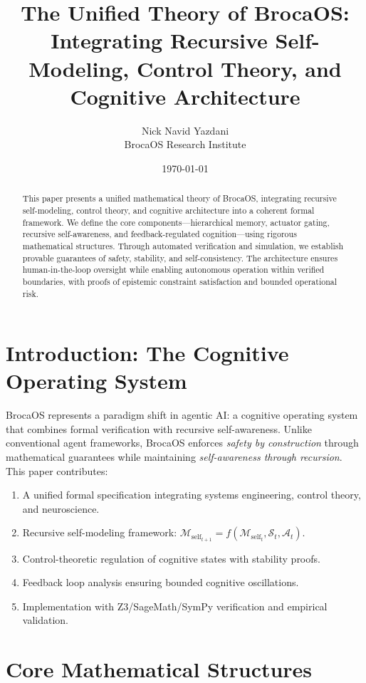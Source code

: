 \documentclass[12pt]{article}
\title{The Unified Theory of BrocaOS: Integrating Recursive Self-Modeling, Control Theory, and Cognitive Architecture}
\author{Nick Navid Yazdani\\BrocaOS Research Institute}
\date{\today}
\theoremstyle{definition}
\newcommand{\state}{\mathcal{S}}
\newcommand{\action}{\mathcal{A}}
\newcommand{\self}{\mathcal{M}_{\text{self}}}
\begin{document}
\maketitle

\begin{abstract}
This paper presents a unified mathematical theory of BrocaOS, integrating recursive self-modeling, control theory, and cognitive architecture into a coherent formal framework. We define the core components—hierarchical memory, actuator gating, recursive self-awareness, and feedback-regulated cognition—using rigorous mathematical structures. Through automated verification and simulation, we establish provable guarantees of safety, stability, and self-consistency. The architecture ensures human-in-the-loop oversight while enabling autonomous operation within verified boundaries, with proofs of epistemic constraint satisfaction and bounded operational risk.
\end{abstract}

\section{Introduction: The Cognitive Operating System}

BrocaOS represents a paradigm shift in agentic AI: a cognitive operating system that combines formal verification with recursive self-awareness. Unlike conventional agent frameworks, BrocaOS enforces \emph{safety by construction} through mathematical guarantees while maintaining \emph{self-awareness through recursion}. This paper contributes:

\begin{enumerate}
    \item A unified formal specification integrating systems engineering, control theory, and neuroscience.
    \item Recursive self-modeling framework: $\self_{t+1} = f(\self_t, \state_t, \action_t)$.
    \item Control-theoretic regulation of cognitive states with stability proofs.
    \item Feedback loop analysis ensuring bounded cognitive oscillations.
    \item Implementation with Z3/SageMath/SymPy verification and empirical validation.
\end{enumerate}

\section{Core Mathematical Structures}
\end{document}

